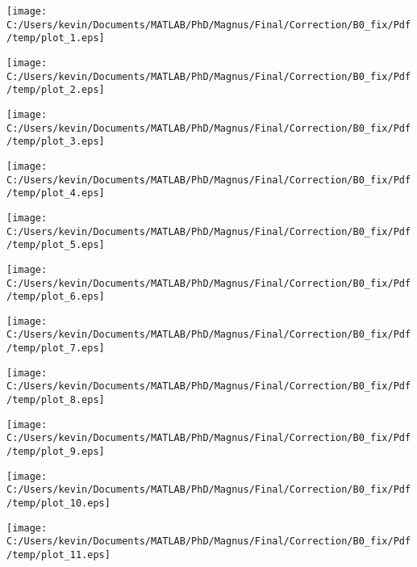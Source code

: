 \begin{landscape}
\texttt{[image: C:/Users/kevin/Documents/MATLAB/PhD/Magnus/Final/Correction/B0\_fix/Pdf/temp/plot\_1.eps]}
\end{landscape}
\begin{landscape}
\texttt{[image: C:/Users/kevin/Documents/MATLAB/PhD/Magnus/Final/Correction/B0\_fix/Pdf/temp/plot\_2.eps]}
\end{landscape}
\begin{landscape}
\texttt{[image: C:/Users/kevin/Documents/MATLAB/PhD/Magnus/Final/Correction/B0\_fix/Pdf/temp/plot\_3.eps]}
\end{landscape}
\begin{landscape}
\texttt{[image: C:/Users/kevin/Documents/MATLAB/PhD/Magnus/Final/Correction/B0\_fix/Pdf/temp/plot\_4.eps]}
\end{landscape}
\begin{landscape}
\texttt{[image: C:/Users/kevin/Documents/MATLAB/PhD/Magnus/Final/Correction/B0\_fix/Pdf/temp/plot\_5.eps]}
\end{landscape}
\begin{landscape}
\texttt{[image: C:/Users/kevin/Documents/MATLAB/PhD/Magnus/Final/Correction/B0\_fix/Pdf/temp/plot\_6.eps]}
\end{landscape}
\begin{landscape}
\texttt{[image: C:/Users/kevin/Documents/MATLAB/PhD/Magnus/Final/Correction/B0\_fix/Pdf/temp/plot\_7.eps]}
\end{landscape}
\begin{landscape}
\texttt{[image: C:/Users/kevin/Documents/MATLAB/PhD/Magnus/Final/Correction/B0\_fix/Pdf/temp/plot\_8.eps]}
\end{landscape}
\begin{landscape}
\texttt{[image: C:/Users/kevin/Documents/MATLAB/PhD/Magnus/Final/Correction/B0\_fix/Pdf/temp/plot\_9.eps]}
\end{landscape}
\begin{landscape}
\texttt{[image: C:/Users/kevin/Documents/MATLAB/PhD/Magnus/Final/Correction/B0\_fix/Pdf/temp/plot\_10.eps]}
\end{landscape}
\begin{landscape}
\texttt{[image: C:/Users/kevin/Documents/MATLAB/PhD/Magnus/Final/Correction/B0\_fix/Pdf/temp/plot\_11.eps]}
\end{landscape}

